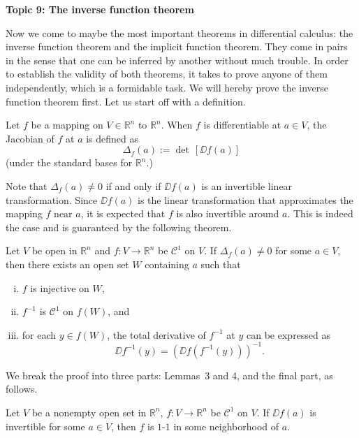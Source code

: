 \documentclass[11pt]{article}
\begin{document}
\begin{center}
  \textbf{Topic 9: The inverse function theorem} 
\end{center}

Now we come to maybe the most important theorems in differential calculus: the inverse function theorem and the implicit function theorem.
They come in pairs in the sense that one can be inferred by another without much trouble.
In order to establish the validity of both theorems, it takes to prove anyone of them independently, which is a formidable task.
We will hereby prove the inverse function theorem first.
Let us start off with a definition.

\begin{defn}
  Let $f$ be a mapping on $V \in \mathbb R^n$ to $\mathbb R^n$.
  When $f$ is differentiable at $a \in V$, the \textsf{Jacobian} of $f$ at $a$ is defined as
  \begin{equation*}
    \Delta_f(a) := \det \, [ \DD f(a) ]
  \end{equation*}
  (under the standard bases for $\mathbb R^n$.)
\end{defn}

Note that $\Delta_f(a) \ne 0$ if and only if $\DD f(a)$ is an invertible linear transformation.
Since $\DD f(a)$ is the linear transformation that approximates the mapping $f$ near $a$, it is expected that $f$ is also invertible around $a$.
This is indeed the case and is guaranteed by the following theorem.

\begin{thm}
  Let $V$ be open in $\mathbb{R}^n$ and $f: V \to \mathbb{R}^n$ be $\mathcal{C}^1$ on $V$.
  If $\Delta_f(a) \ne 0$ for some $a \in V$, then there exists an open set $W$ containing $a$ such that
  \begin{enumerate}[(i)]
    \item $f$ is injective on $W$,
    \item $f^{-1}$ is $\mathcal{C}^1$ on $f(W)$, and
    \item for each $y \in f(W)$, the total derivative of $f^{-1}$ at $y$ can be expressed as
      \[
	\DD f^{-1}(y) = ( \DD f ( f^{-1}(y) ) )^{-1}.
      \]
  \end{enumerate}
\end{thm}

We break the proof into three parts: Lemmas~3 and 4, and the final part, as follows.

\begin{lem}
Let $V$ be a nonempty open set in $\mathbb R^n$, $f: V \to \mathbb R^n$ be $\mathcal C^1$ on $V$.
If $\DD f(a)$ is invertible for some $a \in V$, then $f$ is $1$-$1$ in some neighborhood of $a$.  
\end{lem}
\end{document}
